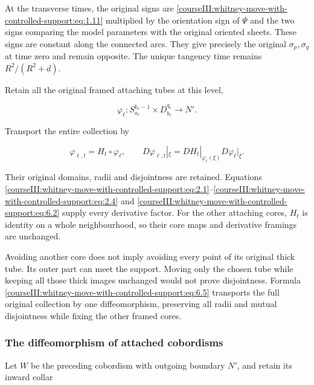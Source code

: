 At the transverse times, the original signs are \eqref{courseIII:whitney-move-with-controlled-support:eq:1.11} multiplied by the orientation sign of \(\Psi\) and the two signs comparing the model parameters with the original oriented sheets. These signs are constant along the connected arcs. They give precisely the original \(\sigma_p,\sigma_q\) at time zero and remain opposite. The unique tangency time remains \(R^2/(R^2+d)\).

Retain all the original framed attaching tubes at this level,

\begin{equation}
\varphi_\ell:S_{a_\ell}^{k_\ell-1}\times D_{b_\ell}^{q_\ell}
\longrightarrow N'.
\label{courseIII:whitney-move-with-controlled-support:eq:6.4}
\end{equation}

Transport the entire collection by

\begin{equation}
\varphi_{\ell,t}=H_t\circ\varphi_\ell,\qquad
D\varphi_{\ell,t}|_\xi
=DH_t|_{\varphi_\ell(\xi)}D\varphi_\ell|_\xi.
\label{courseIII:whitney-move-with-controlled-support:eq:6.5}
\end{equation}

Their original domains, radii and disjointness are retained. Equations \eqref{courseIII:whitney-move-with-controlled-support:eq:2.1}--\eqref{courseIII:whitney-move-with-controlled-support:eq:2.4} and \eqref{courseIII:whitney-move-with-controlled-support:eq:6.2} supply every derivative factor. For the other attaching cores, \(H_t\) is identity on a whole neighbourhood, so their core maps and derivative framings are unchanged.

Avoiding another core does not imply avoiding every point of its original thick tube. Its outer part can meet the support. Moving only the chosen tube while keeping all those thick images unchanged would not prove disjointness. Formula \eqref{courseIII:whitney-move-with-controlled-support:eq:6.5} transports the full original collection by one diffeomorphism, preserving all radii and mutual disjointness while fixing the other framed cores.

\subsubsection{The diffeomorphism of attached cobordisms}
\label{courseIII:whitney-move-with-controlled-support:section-6.1}

Let \(W\) be the preceding cobordism with outgoing boundary \(N'\), and retain its inward collar

